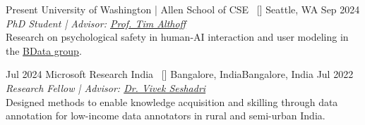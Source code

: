 
\begin{experiences}

\researchexperience
    {Present}   {University of Washington | Allen School of CSE{\normalfont  ~ [\href{https://www.cs.washington.edu/}{\small{\websiteSymbol}}]
    }}{Seattle, WA}{}
    {Sep 2024} {\textit{PhD Student | Advisor:  \href{https://homes.cs.washington.edu/~althoff/}{Prof. Tim Althoff}}\\
     Research on psychological safety in human-AI interaction and user modeling in the \href{https://bdata.uw.edu/}{BData group}.
    }
    \emptySeparator

\researchexperience
    {Jul 2024}   {Microsoft Research India{\normalfont  ~ [\href{https://www.microsoft.com/en-us/research/lab/microsoft-research-india/}{\small{\websiteSymbol}}]
    }}{Bangalore, India}{Bangalore, India}
    {Jul 2022} {\textit{Research Fellow | Advisor:  \href{https://www.microsoft.com/en-us/research/people/visesha/}{Dr. Vivek Seshadri}}\\
     Designed methods to enable knowledge acquisition and skilling through data annotation for low-income data annotators in rural and semi-urban India.
    }
    \emptySeparator


\end{experiences}
